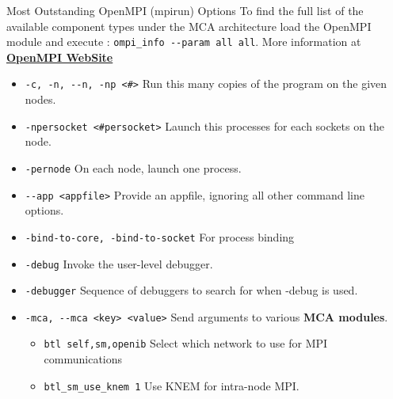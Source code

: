 \documentclass[final,t]{beamer}
\begin{document}
\begin{frame}[fragile]{}
\begin{columns}[t]
\begin{column}{.35\linewidth}
      
      \begin{block}{Most Outstanding OpenMPI (mpirun) Options}
              To find the full list of the available component types under the MCA architecture load the OpenMPI module and execute : \verb|ompi_info --param all all|. More information at \textbf{\href{http://www.open-mpi.org/doc/v1.6/man1/mpirun.1.php}{OpenMPI WebSite}} \\
      \begin{itemize}
         \item \verb|-c, -n, --n, -np <#>| Run this many copies of the program on the given nodes. 
         \item \verb|-npersocket <#persocket>| Launch this processes for each sockets on the node.
         \item \verb|-pernode| On each node, launch one process.
         \item \verb|--app <appfile>| Provide an appfile, ignoring all other command line options.
         \item \verb|-bind-to-core, -bind-to-socket| For process binding 
         \item \verb|-debug| Invoke the user-level debugger.
         \item \verb|-debugger| Sequence of debuggers to search for when -debug is used.
         \item \verb|-mca, --mca <key> <value>| Send arguments to various \textbf{MCA modules}.
         \begin{itemize}
         \item \verb|btl self,sm,openib| Select which network to use for MPI communications
         \item \verb|btl_sm_use_knem 1| Use KNEM for intra-node MPI.

\end{itemize}
\end{itemize}
\end{block}
\end{column}
\end{columns}
\end{frame}
\end{document}
